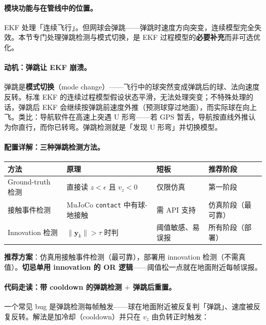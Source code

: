 \paragraph{模块功能与在管线中的位置。}EKF 处理「连续飞行」。但网球会弹跳——弹跳时速度方向突变，连续模型完全失效。本节专门处理弹跳检测与模式切换，是 EKF 过程模型的\textbf{必要补充}而非可选优化。

\paragraph{动机：弹跳让 EKF 崩溃。}弹跳是\textbf{模式切换}（mode change）——飞行中的球突然变成弹跳后的球、法向速度反转。标准 EKF 的连续过程模型假设状态平滑，无法处理突变；不特殊处理的话，弹跳后 EKF 会继续按弹跳前速度外推（预测球穿过地面），而实际球在向上飞。类比：导航软件在高速上突遇 U 形弯——若 GPS 暂丢，导航按直线外推认为你直行，而你已转弯。弹跳检测就是「发现 U 形弯」并切换模型。

\paragraph{配置详解：三种弹跳检测方法。}

\begin{center}
\small
\begin{tabular}{@{}llll@{}}
\toprule
方法 & 原理 & 短板 & 推荐阶段 \\
\midrule
Ground-truth 检测 & 直接读 $z<\epsilon$ 且 $v_z<0$ & 仅限仿真 & 第一阶段 \\
接触事件检测 & MuJoCo \verb|contact| 中有球-地接触 & 需 API 支持 & 仿真阶段（最可靠） \\
Innovation 检测 & $\|\mathbf y_k\|>\tau$ 时判 & 阈值敏感、易误报 & 所有阶段（部署） \\
\bottomrule
\end{tabular}
\end{center}

\textbf{推荐方案}：仿真用接触事件检测（最可靠），部署用 innovation 检测（不需真值）。\textbf{切忌单用 innovation 的 OR 逻辑}——阈值松一点就在地面附近每帧误报。

\paragraph{代码走读：带 cooldown 的弹跳检测 $+$ 弹跳后重置。}一个常见 bug 是弹跳检测每帧触发——球在地面附近被反复判「弹跳」、速度被反复反转。解法是加冷却（cooldown）并只在 $v_z$ 由负转正时触发：

